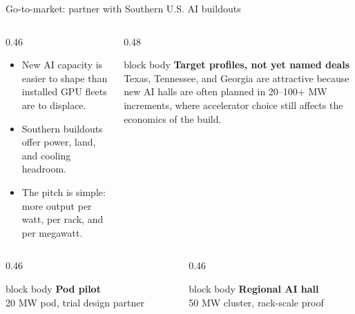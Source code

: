 \documentclass[aspectratio=169,11pt]{beamer}
\newcommand{\softpanel}[2]{%
\begin{beamercolorbox}[wd=\linewidth,sep=0.8em,rounded=true]{block body}
{\bfseries #1}\\[0.25em]
{\small #2}
\end{beamercolorbox}
}
\begin{document}
\begin{frame}{Go-to-market: partner with Southern U.S. AI buildouts}
\begin{columns}[T,totalwidth=\textwidth]
  \begin{column}{0.46\textwidth}
    \small\raggedright
    \begin{itemize}
      \item New AI capacity is easier to shape than installed GPU fleets are to displace.
      \item Southern buildouts offer power, land, and cooling headroom.
      \item The pitch is simple: more output per watt, per rack, and per megawatt.
    \end{itemize}
  \end{column}
  \begin{column}{0.48\textwidth}
    \softpanel{Target profiles, not yet named deals}{Texas, Tennessee, and Georgia are attractive because new AI halls are often planned in 20--100+ MW increments, where accelerator choice still affects the economics of the build.}
  \end{column}
\end{columns}

\vspace{0.3em}

\begin{columns}[T,totalwidth=\textwidth]
  \begin{column}{0.46\textwidth}
    \begin{beamercolorbox}[wd=\linewidth,sep=0.5em,rounded=true]{block body}
      {\bfseries Pod pilot}\\[0.2em]
      {\scriptsize 20 MW pod, trial design partner}
    \end{beamercolorbox}
  \end{column}
  \begin{column}{0.46\textwidth}
    \begin{beamercolorbox}[wd=\linewidth,sep=0.5em,rounded=true]{block body}
      {\bfseries Regional AI hall}\\[0.2em]
      {\scriptsize 50 MW cluster, rack-scale proof}
    \end{beamercolorbox}
  \end{column}
\end{columns}
\end{frame}
\end{document}
